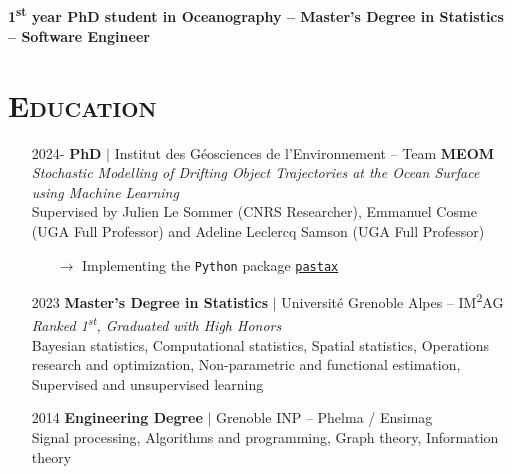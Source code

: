 \documentclass{article}
\begin{document}
\\[.1 cm]

\begin{center}
    \large{\textbf{1\textsuperscript{st} year PhD student in Oceanography – Master's Degree in Statistics – Software Engineer}}
\end{center}

\section*{\textsc{Education}}
\begin{itemize}
    \item[] 2024- \tabto{2cm} \textbf{PhD} $\vert$ Institut des Géosciences de l'Environnement – Team \textbf{MEOM} \\[.1 cm]
    \tabto{2cm} \textit{Stochastic Modelling of Drifting Object Trajectories at the Ocean Surface using Machine Learning} \\[.1 cm]
    \tabto{2cm} Supervised by Julien Le Sommer (CNRS Researcher), Emmanuel Cosme (UGA Full Professor) and \tabto{2cm} Adeline Leclercq Samson (UGA Full Professor)
    \vspace{-.1 cm}
    \begin{itemize}[left=2cm]
        \item[$\rightarrow$] Implementing the \texttt{Python} package \href{https://github.com/vadmbertr/pastax}{\texttt{pastax}}
    \end{itemize}
    \item[] 2023 \tabto{2cm} \textbf{Master’s Degree in Statistics} $\vert$ Université Grenoble Alpes – IM\textsuperscript{2}AG \\[.15 cm]
    \tabto{2cm} \textit{Ranked 1\textsuperscript{st}, Graduated with High Honors} \\[.1 cm]
    \tabto{2cm} Bayesian statistics, Computational statistics, Spatial statistics, Operations research and optimization, \tabto{2cm} Non-parametric and functional estimation, Supervised and unsupervised learning
    \item[] 2014 \tabto{2cm} \textbf{Engineering Degree} $\vert$ Grenoble INP – Phelma / Ensimag \\[.1 cm]
    \tabto{2cm} Signal processing, Algorithms and programming, Graph theory, Information theory
\end{itemize}
\end{document}
